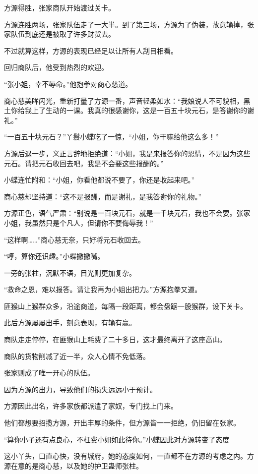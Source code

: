 \begin{this_body}
方源得胜，张家商队开始渡过关卡。

方源连胜两场，张家队伍走了一大半。到了第三场，方源为了伪装，故意输掉，张家队伍到底还是被取了许多财货去。

不过就算这样，方源的表现已经足以让所有人刮目相看。

回归商队后，他受到热烈的欢迎。

“张小姐，幸不辱命。”他抱拳对商心慈道。

商心慈美眸闪光，重新打量了方源一番，声音轻柔如水：“我娘说人不可貌相，黑土你给我上了生动的一课。我真的很感谢你，这是一百五十块元石，是答谢你的谢礼。”

“一百五十块元石？”丫鬟小蝶吃了一惊，“小姐，你干嘛给他这么多！”

方源后退一步，义正言辞地拒绝道：“小姐，我是来报答你的恩情，不是因为这些元石。请把元石收回去吧，我是不会要这些报酬的。”

小蝶连忙附和：“小姐，你看他都说不要了，你还是收起来吧。”

商心慈却坚持道：“这不是报酬，而是谢礼，是我答谢你的礼物。”

方源正色，语气严肃：“别说是一百块元石，就是一千块元石，我也不会要。张家小姐，我虽然只是个凡人，但请你不要侮辱我！”

“这样啊……”商心慈无奈，只好将元石收回去。

“哼，算你还识趣。”小蝶撇撇嘴。

一旁的张柱，沉默不语，目光则更加复杂。

“救命之恩，难以报答。请让我再为小姐出把力。”方源抱拳又道。

匪猴山上猴群众多，沿途商道，每隔一段距离，都会盘踞一股猴群，设下关卡。

此后方源屡屡出手，刻意表现，有输有赢。

商队走走停停，在匪猴山上耗费了二十多日，这才最终离开了这座高山。

商队的货物削减了近一半，众人心情不免低落。

张家则成了唯一开心的队伍。

因为方源的出力，导致他们的损失远远小于预计。

方源因此出名，许多家族都派遣了家奴，专门找上门来。

他们都想要招揽方源，开出丰厚的条件，但方源皆一一拒绝，仍旧留在张家。

“算你小子还有点良心，不枉费小姐如此待你。”小蝶因此对方源转变了态度

这小丫头，口直心快，没有城府，她的态度如何，一直都不在方源的考虑之内。方源在意的是商心慈，以及她的护卫蛊师张柱。


\end{this_body}
